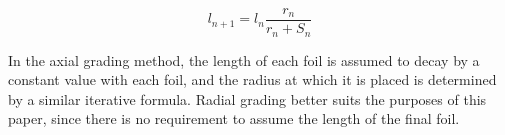 \begin{equation}
   \label{eq:recursive}
  l_{n+1}= l_{n}\frac{r_{n}}{r_{n} + S_{n}}
\end{equation}

In the axial grading method, the length of each foil is assumed to decay by a constant value with each foil, and the radius at which it is placed is determined by a similar iterative formula.
Radial grading better suits the purposes of this paper, since there is no requirement to assume the length of the final foil.

